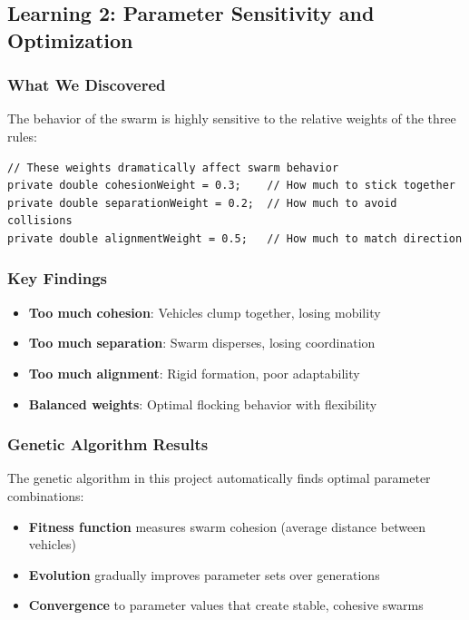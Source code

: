 \documentclass[12pt,a4paper]{article}
\begin{document}
\subsection{Learning 2: Parameter Sensitivity and Optimization}

\subsubsection{What We Discovered}
The behavior of the swarm is highly sensitive to the relative weights of the three rules:

\begin{lstlisting}
// These weights dramatically affect swarm behavior
private double cohesionWeight = 0.3;    // How much to stick together
private double separationWeight = 0.2;  // How much to avoid collisions
private double alignmentWeight = 0.5;   // How much to match direction
\end{lstlisting}

\subsubsection{Key Findings}
\begin{itemize}
    \item \textbf{Too much cohesion}: Vehicles clump together, losing mobility
    \item \textbf{Too much separation}: Swarm disperses, losing coordination
    \item \textbf{Too much alignment}: Rigid formation, poor adaptability
    \item \textbf{Balanced weights}: Optimal flocking behavior with flexibility
\end{itemize}

\subsubsection{Genetic Algorithm Results}
The genetic algorithm in this project automatically finds optimal parameter combinations:
\begin{itemize}
    \item \textbf{Fitness function} measures swarm cohesion (average distance between vehicles)
    \item \textbf{Evolution} gradually improves parameter sets over generations
    \item \textbf{Convergence} to parameter values that create stable, cohesive swarms
\end{itemize}
\end{document}
